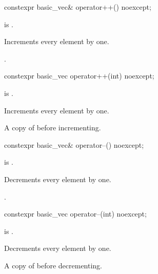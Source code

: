 \begin{itemdecl}
constexpr basic_vec& operator++() noexcept;
\end{itemdecl}

\begin{itemdescr}
\pnum
\constraints
{} is .

\pnum
\effects
Increments every element by one.

\pnum
\returns
{}.
\end{itemdescr}

\begin{itemdecl}
constexpr basic_vec operator++(int) noexcept;
\end{itemdecl}

\begin{itemdescr}
\pnum
\constraints
{} is .

\pnum
\effects
Increments every element by one.

\pnum
\returns
A copy of  before incrementing.
\end{itemdescr}

\begin{itemdecl}
constexpr basic_vec& operator--() noexcept;
\end{itemdecl}

\begin{itemdescr}
\pnum
\constraints
{} is .

\pnum
\effects
Decrements every element by one.

\pnum
\returns
{}.
\end{itemdescr}

\begin{itemdecl}
constexpr basic_vec operator--(int) noexcept;
\end{itemdecl}

\begin{itemdescr}
\pnum
\constraints
{} is .

\pnum
\effects
Decrements every element by one.

\pnum
\returns
A copy of  before decrementing.
\end{itemdescr}

